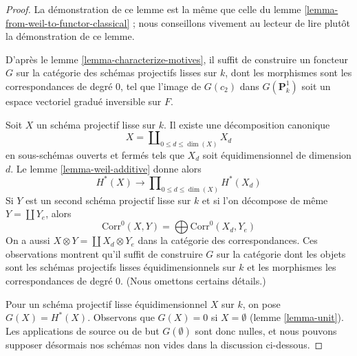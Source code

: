 \begin{proof}
La démonstration de ce lemme est la même que celle du
lemme \ref{lemma-from-weil-to-functor-classical} ;
nous conseillons vivement au lecteur de lire plutôt la démonstration de ce lemme.

\medskip\noindent
D'après le lemme \ref{lemma-characterize-motives}, il suffit de construire un foncteur
$G$ sur la catégorie des schémas projectifs lisses sur $k$,
dont les morphismes sont les correspondances de degré $0$, tel que
l'image de $G(c_2)$ dans $G(\mathbf{P}^1_k)$ soit un espace vectoriel gradué
inversible sur $F$.

\medskip\noindent
Soit $X$ un schéma projectif lisse sur $k$. Il existe une décomposition
canonique
$$
X = \coprod\nolimits_{0 \leq d \le \dim(X)} X_d
$$
en sous-schémas ouverts et fermés tels que $X_d$ soit équidimensionnel
de dimension $d$. Le lemme \ref{lemma-weil-additive} donne alors
$$
H^*(X) \longrightarrow \prod\nolimits_{0 \leq d \le \dim(X)} H^*(X_d)
$$
Si $Y$ est un second schéma projectif lisse sur $k$
et si l'on décompose de même $Y = \coprod Y_e$, alors
$$
\text{Corr}^0(X, Y) = \bigoplus \text{Corr}^0(X_d, Y_e)
$$
On a aussi $X \otimes Y = \coprod X_d \otimes Y_e$ dans
la catégorie des correspondances. Ces observations montrent
qu'il suffit de construire $G$ sur la catégorie dont les objets
sont les schémas projectifs lisses équidimensionnels sur $k$
et les morphismes les correspondances de degré $0$.
(Nous omettons certains détails.)

\medskip\noindent
Pour un schéma projectif lisse équidimensionnel
$X$ sur $k$, on pose $G(X) = H^*(X)$. Observons que $G(X) = 0$
si $X = \emptyset$ (lemme \ref{lemma-unit}). Les applications
de source ou de but $G(\emptyset)$ sont donc nulles, et nous pouvons
supposer désormais nos schémas non vides dans la discussion ci-dessous.


\end{proof}

